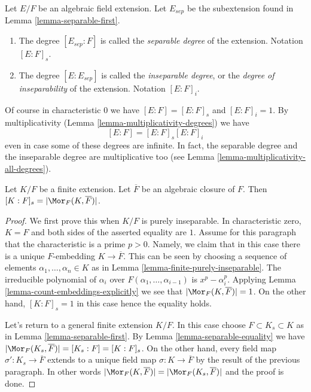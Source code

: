 \begin{definition}
\label{definition-insep-degree}
Let $E/F$ be an algebraic field extension. Let $E_{sep}$ be the subextension
found in Lemma \ref{lemma-separable-first}.
\begin{enumerate}
\item The degree $[E_{sep} : F]$ is called the {\it separable
degree} of the extension. Notation $[E : F]_s$.
\item The degree $[E : E_{sep}]$ is called the {\it inseparable
degree}, or the {\it degree of inseparability} of the extension.
Notation $[E : F]_i$.
\end{enumerate}
\end{definition}

\noindent
Of course in characteristic $0$ we have $[E : F] = [E : F]_s$ and
$[E : F]_i = 1$. By multiplicativity
(Lemma \ref{lemma-multiplicativity-degrees}) we have
$$
[E : F] = [E : F]_s [E : F]_i
$$
even in case some of these degrees are infinite. In fact, the separable
degree and the inseparable degree are multiplicative too (see
Lemma \ref{lemma-multiplicativity-all-degrees}).

\begin{lemma}
\label{lemma-separable-degree}
Let $K/F$ be a finite extension. Let $\overline{F}$ be an algebraic
closure of $F$. Then $[K : F]_s = |\Mor_F(K, \overline{F})|$.
\end{lemma}

\begin{proof}
We first prove this when $K/F$ is purely inseparable. In characteristic
zero, $K = F$ and both sides of the asserted equality are $1$.
Assume for this paragraph that the characteristic is a prime $p > 0$.
Namely, we claim that
in this case there is a unique $F$-embedding $K \to \overline{F}$. This can be
seen by choosing a sequence of elements $\alpha_1, \ldots, \alpha_n \in K$
as in Lemma \ref{lemma-finite-purely-inseparable}. The irreducible polynomial
of $\alpha_i$ over $F(\alpha_1, \ldots, \alpha_{i - 1})$ is $x^p - \alpha_i^p$.
Applying Lemma \ref{lemma-count-embeddings-explicitly} we see that
$|\Mor_F(K, \overline{F})| = 1$. On the other hand, $[K : F]_s = 1$
in this case hence the equality holds.

\medskip\noindent
Let's return to a general finite extension $K/F$. In this case
choose $F \subset K_s \subset K$ as in Lemma \ref{lemma-separable-first}.
By Lemma \ref{lemma-separable-equality} we have
$|\Mor_F(K_s, \overline{F})| = [K_s : F] = [K : F]_s$.
On the other hand, every field map $\sigma' : K_s \to \overline{F}$
extends to a unique field map $\sigma : K \to \overline{F}$ by the
result of the previous paragraph. In other words
$|\Mor_F(K, \overline{F})| = |\Mor_F(K_s, \overline{F})|$
and the proof is done.
\end{proof}


